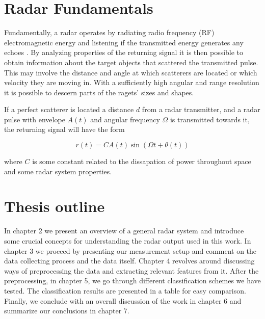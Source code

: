 \section{Radar Fundamentals}

Fundamentally, a radar operates by radiating radio frequency (RF) electromagnetic energy and listening if the transmitted energy generates any echoes \citep{skolnik_2009}. By analyzing properties of the returning signal it is then possible to obtain information about the target objects that scattered the transmitted pulse. This may involve the distance and angle at which scatterers are located or which velocity they are moving in. With a sufficiently high angular and range resolution it is possible to descern parts of the ragets' sizes and shapes.  

If a perfect scatterer is located a distance $d$ from a radar transmitter, and a radar pulse with envelope $A(t)$ and angular frequency $\Omega$ is transmitted towards it, the returning signal will have the form \citep{richards_2014}

\begin{equation}
	r(t) = CA(t)\sin(\Omega t + \theta(t))
\end{equation}

where $C$ is some constant related to the dissapation of power throughout space and some radar system properties. %


\section{Thesis outline}

In chapter 2 we present an overview of a general radar system and introduce some crucial concepts for understanding the radar output used in this work. In chapter 3 we proceed by presenting our measurement setup and comment on the data collecting process and the data itself. Chapter 4 revolves around discussing ways of preprocessing the data and extracting relevant features from it. After the preprocessing, in chapter 5, we go through different classification schemes we have tested. The classification results are presented in a table for easy comparison. Finally, we conclude with an overall discussion of the work in chapter 6 and summarize our conclusions in chapter 7.






